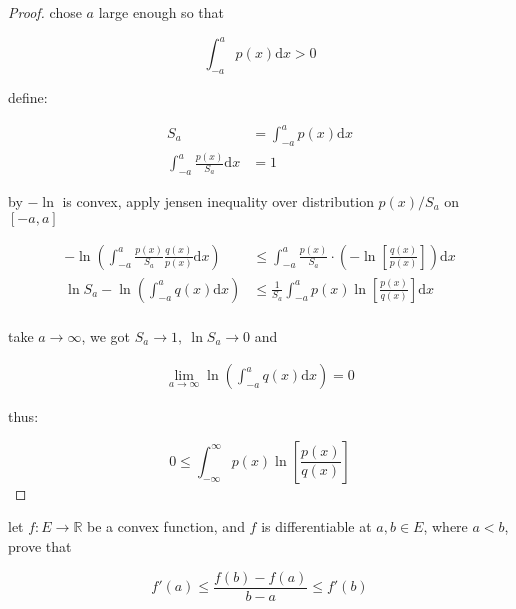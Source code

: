 \documentclass[11pt,a4paper]{article}
\begin{document}
\begin{proof}

    chose $a$ large enough so that

    \[
        \int_{-a}^{a} p(x) \mathrm{d}x > 0
    \]

    define:

    \begin{align*}
        S_a &= \int_{-a}^{a} p(x) \mathrm{d}x \\
       \int_{-a}^{a} \frac{p(x)}{S_a} \mathrm{d}x &= 1
    \end{align*}

    by $-\ln$ is convex, apply jensen inequality over distribution $p(x)/S_a$ on $[-a,a]$

    \begin{align*}
        -\ln \left(\int_{-a}^{a}\frac{p(x)}{S_a} \frac{q(x)}{p(x)} \mathrm{d}x \right) &\le \int_{-a}^{a} \frac{p(x)}{S_a}\cdot\left( -\ln \left[\frac{q(x)}{p(x)}\right] \right) \mathrm{d}x\\
        \ln S_a -\ln \left(\int_{-a}^{a} q(x) \mathrm{d}x \right) &\le \frac{1}{S_a}\int_{-a}^{a} p(x) \ln\left[\frac{p(x)}{q(x)}\right] \mathrm{d}x\\
    \end{align*}

    take $a \to \infty$, we got $S_a \to 1,\: \ln S_a \to 0$ and

    \begin{align*}
        \lim_{a \to \infty}\ln \left(\int_{-a}^{a} q(x) \mathrm{d}x \right) = 0
    \end{align*}

    thus:

    \[
        0 \le \int_{-\infty}^{\infty} p(x) \ln \left[\frac{p(x)}{q(x)} \right]
    \]
\end{proof}

\begin{exercise}
    let $f: E \to \mathbb{R}$ be a convex function, and $f$ is differentiable at $a,b \in E$, where $a < b$,
    prove that 

    \[
    f'(a) \le \frac{f(b) - f(a)}{b-a} \le f'(b)
    \]
    
\end{exercise}
\end{document}
